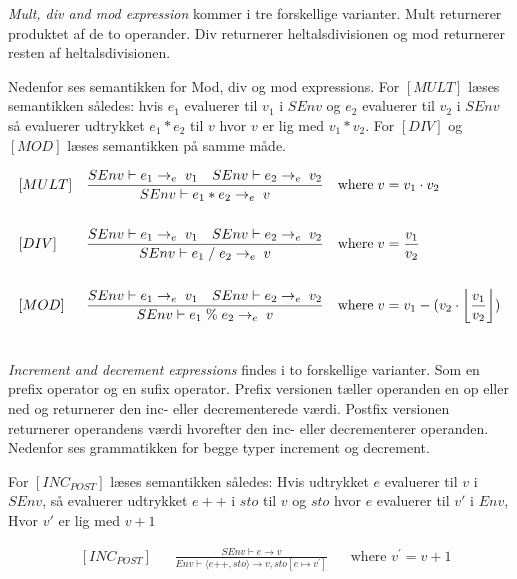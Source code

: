 \textit{Mult, div and mod expression} kommer i tre forskellige varianter. Mult returnerer produktet af de to operander. Div returnerer heltalsdivisionen og mod returnerer resten af heltalsdivisionen.

\noindent Nedenfor ses semantikken for Mod, div og mod expressions.
For $[MULT]$ læses semantikken således: hvis $e_1$ evaluerer til $v_1$ i $SEnv$ og $e_2$ evaluerer til $v_2$ i $SEnv$ så evaluerer udtrykket $e_1 * e_2$ til $v$ hvor $v$ er lig med $v_1 * v_2$.
For $[DIV]$ og $[MOD]$ læses semantikken på samme måde.

\begin{align*}
&[MULT] & &\frac{SEnv \vdash e_1 \rightarrow_e\; v_1\quad SEnv \vdash e_2 \rightarrow_e\; v_2}{SEnv \vdash e_1 * e_2 \rightarrow_e\; v} & &\text{where}\; v = v_1 \cdot v_2\\\\
&[DIV] & &\frac{SEnv \vdash e_1 \rightarrow_e\; v_1\quad SEnv \vdash e_2 \rightarrow_e\; v_2}{SEnv \vdash e_1\; /\; e_2 \rightarrow_e\; v} & &\text{where}\; v = \frac{v_1}{v_2}\\\\
&[MOD] & &\frac{SEnv \vdash e_1 \rightarrow_e\; v_1\quad SEnv \vdash e_2 \rightarrow_e\; v_2}{SEnv \vdash e_1\; \%\; e_2 \rightarrow_e\; v} & &\text{where}\; v = v_1 - (v_2 \cdot \floor*{\frac{v_1}{v_2}})\\\\
\end{align*}


\textit{Increment and decrement expressions} findes i to forskellige varianter. Som en prefix operator og en sufix operator. Prefix versionen tæller operanden en op eller ned og returnerer den inc- eller decrementerede værdi. Postfix versionen returnerer operandens værdi hvorefter den inc- eller decrementerer operanden. Nedenfor ses grammatikken for begge typer increment og decrement.

\noindent For $[INC_{POST}]$ læses semantikken således: Hvis udtrykket $e$ evaluerer til $v$ i $SEnv$, så evaluerer udtrykket $e++$ i $sto$ til $v$ og $sto$ hvor $e$ evaluerer til $v'$ i $Env$, Hvor $v'$ er lig med $v+1$ 

\begin{align*}
&[INC_{POST}] & &\frac{SEnv \vdash e \rightarrow v}{Env \vdash \langle e\text{++}, sto \rangle \rightarrow  v, sto[e \mapsto v^\prime] } & &\text{where }v^\prime = v + 1\\\\
\end{align*}
